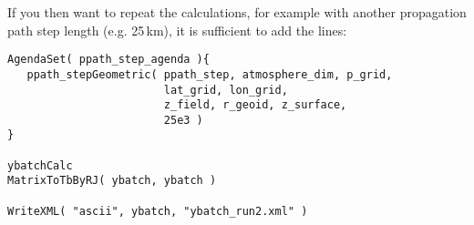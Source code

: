 If you then want to repeat the calculations, for example with another
propagation path step length (e.g. 25\,km), it is sufficient to add
the lines:

\begin{verbatim}
AgendaSet( ppath_step_agenda ){
   ppath_stepGeometric( ppath_step, atmosphere_dim, p_grid,
                        lat_grid, lon_grid,
                        z_field, r_geoid, z_surface,
                        25e3 )
}

ybatchCalc
MatrixToTbByRJ( ybatch, ybatch )

WriteXML( "ascii", ybatch, "ybatch_run2.xml" )
\end{verbatim}


